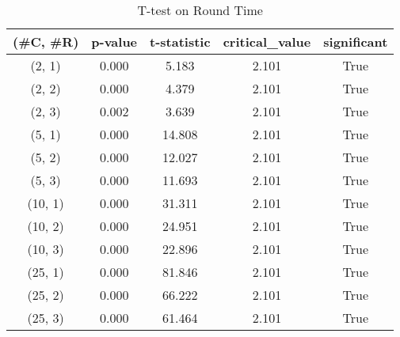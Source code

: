 \begin{table}
\centering
\caption{T-test on Round Time}
\label{tab:t-testRound}
\begin{tabular}{|c|c|c|c|c|}
\toprule
(\#C, \#R) &  p-value &  t-statistic &  critical\_value &  significant \\
\midrule
  (2, 1) &    0.000 &        5.183 &           2.101 &         True \\
  (2, 2) &    0.000 &        4.379 &           2.101 &         True \\
  (2, 3) &    0.002 &        3.639 &           2.101 &         True \\
  (5, 1) &    0.000 &       14.808 &           2.101 &         True \\
  (5, 2) &    0.000 &       12.027 &           2.101 &         True \\
  (5, 3) &    0.000 &       11.693 &           2.101 &         True \\
 (10, 1) &    0.000 &       31.311 &           2.101 &         True \\
 (10, 2) &    0.000 &       24.951 &           2.101 &         True \\
 (10, 3) &    0.000 &       22.896 &           2.101 &         True \\
 (25, 1) &    0.000 &       81.846 &           2.101 &         True \\
 (25, 2) &    0.000 &       66.222 &           2.101 &         True \\
 (25, 3) &    0.000 &       61.464 &           2.101 &         True \\
\bottomrule
\end{tabular}
\end{table}
